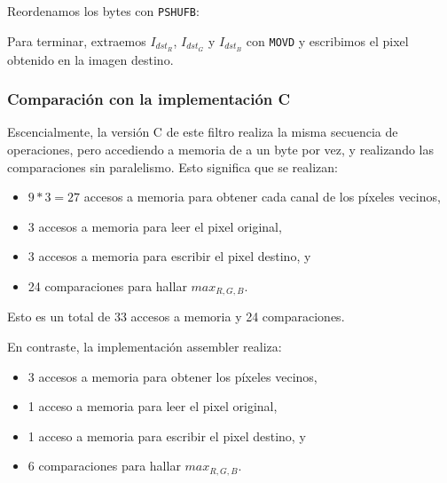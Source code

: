 Reordenamos los bytes con \texttt{PSHUFB}:

\begin{center}
\end{center}

Para terminar, extraemos $I_{dst_R}$, $I_{dst_G}$ y $I_{dst_B}$ con \texttt{MOVD}
y escribimos el pixel obtenido en la imagen destino.




\subsubsection{Comparación con la implementación C}

Escencialmente, la versión C de este filtro realiza la misma secuencia de operaciones,
pero accediendo a memoria de a un byte por vez, y realizando las comparaciones
sin paralelismo. Esto significa que se realizan:

\begin{itemize}
    \item $9 * 3 = 27$ accesos a memoria para obtener cada canal de los píxeles vecinos,
    \item 3 accesos a memoria para leer el pixel original,
    \item 3 accesos a memoria para escribir el pixel destino, y
    \item 24 comparaciones para hallar $max_{R,G,B}$.
\end{itemize}

Esto es un total de 33 accesos a memoria y 24 comparaciones.

En contraste, la implementación assembler realiza:

\begin{itemize}
    \item 3 accesos a memoria para obtener los píxeles vecinos,
    \item 1 acceso a memoria para leer el pixel original,
    \item 1 acceso a memoria para escribir el pixel destino, y
    \item 6 comparaciones para hallar $max_{R,G,B}$.
\end{itemize}

